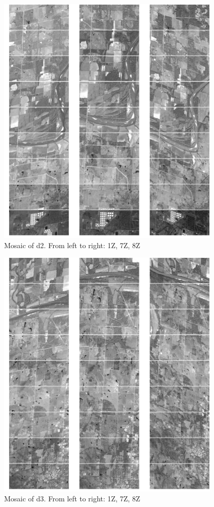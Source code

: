 \documentclass[paper=a4, fontsize=11pt, onecolumn, tikz, dvipsnames, svgnames, x11names]{article}
\begin{document}
\newpage
\begin{figure}
    \centering
    \includegraphics[width = 0.95\textwidth]{d2.png}
    \caption{Mosaic of d2. From left to right: 1Z, 7Z, 8Z}
    \label{}
\end{figure}

\newpage
\begin{figure}
    \centering
    \includegraphics[width = 0.95\textwidth]{d3.png}
    \caption{Mosaic of d3. From left to right: 1Z, 7Z, 8Z}
    \label{}
\end{figure}
\end{document}
